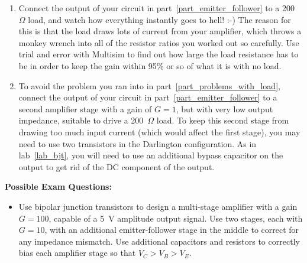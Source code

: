 \begin{enumerate}[wide]
\item Connect the output of your circuit in part~\ref{part_emitter_follower} to a 200~$\Omega$ load, and watch how everything instantly goes to hell!  :-)  The reason for this is that the load draws lots of current from your amplifier, which throws a monkey wrench into all of the resistor ratios you worked out so carefully.  Use trial and error with Multisim to find out how large the load resistance has to be in order to keep the gain within 95\% or so of what it is with no load. \label{part_problems_with_load}

\item To avoid the problem you ran into in part~\ref{part_problems_with_load}, connect the output of your circuit in part~\ref{part_emitter_follower} to a second amplifier stage with a gain of $G=1$, but with very low output impedance, suitable to drive a 200~$\Omega$ load.  To keep this second stage from drawing too much input current (which would affect the first stage), you may need to use two transistors in the Darlington configuration.  As in lab~\ref{lab_bjt}, you will need to use an additional bypass capacitor on the output to get rid of the DC component of the output.


\end{enumerate}

\pagebreak[3]
\textbf{Possible Exam Questions:}

\begin{itemize}

\item Use bipolar junction transistors to design a multi-stage amplifier with a gain $G=100$, capable of a 5~V amplitude output signal.  Use two stages, each with $G=10$, with an additional emitter-follower stage in the middle to correct for any impedance mismatch.  Use additional capacitors and resistors to correctly bias each amplifier stage so that $V_C > V_B > V_E$.

\end{itemize}




